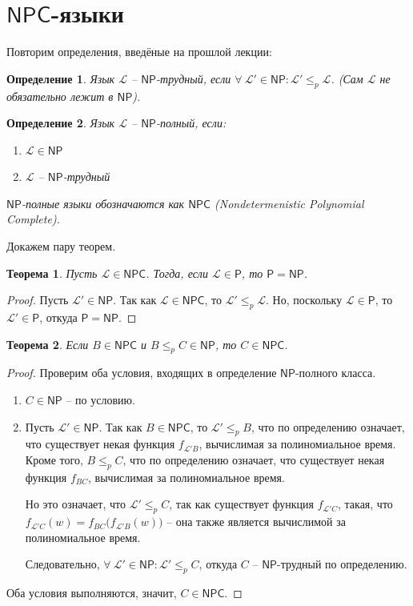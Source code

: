 \documentclass[a4paper,12pt]{article}
\newtheorem{definition}{Определение}
\newcommand{\Pclass}{\mathsf{P}}
\newcommand{\NPclass}{\mathsf{NP}}
\newcommand{\NPCclass}{\mathsf{NPC}}
\newtheorem{theorem}{Теорема}
\renewcommand{\L}{\mathscr{L}}
\begin{document}
\section{\(\NPCclass\)-языки}
Повторим определения, введёные на прошлой лекции:
\begin{definition}
    Язык $\mathscr{L}$ -- $\NPclass$-трудный, если $\forall\ \mathscr{L}' \in \NPclass: \mathscr{L}' \leqslant_p \mathscr{L}$. (Сам $\mathscr{L}$ не обязательно лежит в $\NPclass$).
\end{definition}
\begin{definition}
    Язык $\mathscr{L}$ -- $\NPclass$-полный, если:
    \begin{enumerate}
        \item $\mathscr{L} \in \NPclass$
        \item $\mathscr{L}$ -- $\NPclass$-трудный
    \end{enumerate}
    $\NPclass$-полные языки обозначаются как $\NPCclass$ (Nondeterme\-nistic Polynomial Complete).
\end{definition}
Докажем пару теорем.
\begin{theorem}
Пусть $\L \in \NPCclass$. Тогда, если $\L \in \Pclass$, то $\Pclass = \NPclass$.
\end{theorem}
\begin{proof}
    Пусть $\L' \in \NPclass$. Так как $\L \in \NPCclass$, то $\L' \leqslant_p \L$. Но, поскольку $\L \in \Pclass$, то $\L' \in \Pclass$, откуда $\Pclass = \NPclass$.
    
\end{proof}
\begin{theorem}
Если $B \in \NPCclass$ и $B \leqslant_p C \in \NPclass$, то $C \in \NPCclass$.
\end{theorem}
\begin{proof}
    Проверим оба условия, входящих в определение $\NPclass$-полного класса.
    \begin{enumerate}
        \item $C \in \NPclass$ -- по условию.
        \item Пусть $\L' \in \NPclass$. Так как $B \in \NPCclass$, то $\L' \leqslant_p B$, что по определению означает, что существует некая функция $f_{\L'B}$, вычислимая за полиномиальное время. Кроме того, $B \leqslant_p C$, что по определению означает, что существует некая функция $f_{BC}$, вычислимая за полиномиальное время.
        
        Но это означает, что $\L' \leqslant_p C$, так как существует функция $f_{\L'C}$, такая, что $f_{\L'C}(w) = f_{BC}\big(f_{\L'B}(w)\big)$ -- она также является вычислимой за полиномиальное время.
        
        Следовательно, $\forall\ \L' \in \NPclass: \L' \leqslant_p C$, откуда $C$ -- $\NPclass$-трудный по определению.
    \end{enumerate}
    Оба условия выполняются, значит, $C \in \NPCclass$.
\end{proof}
\end{document}
